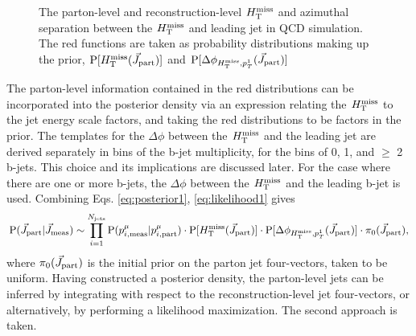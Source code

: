\begin{figure}[h]
\centering
{}
\caption{The parton-level and reconstruction-level $H_{\text{T}}^{\rm miss}$ and azimuthal separation between the $H_{\text{T}}^{\rm miss}$ and leading jet in QCD simulation. The red functions are taken as probability distributions making up the prior, $\text{P}[H_{\text{T}}^{\rm miss}(\vec{J}_{\rm part})]$ and $\text{P}[\Delta\phi_{H_{\text{T}}^{\rm miss},p_{T}^1}(\vec{J}_{\rm part})]$}
\label{fig:Mht}
\end{figure}

The parton-level information contained in the red distributions can be incorporated into the posterior density via an expression relating the $H_{\text{T}}^{\rm miss}$ to the jet energy scale factors, and taking the red distributions to be factors in the prior. The templates for the $\Delta\phi$ between the $H_{\text{T}}^{\rm miss}$ and the leading jet are derived separately in bins of the b-jet multiplicity, for the bins of 0, 1, and $\geq$ 2 b-jets.  This choice and its implications are discussed later. For the case where there are one or more b-jets, the $\Delta\phi$ between the $H_{\text{T}}^{\rm miss}$ and the leading b-jet is used. Combining Eqs. \ref{eq:posterior1}, \ref{eq:likelihood1} gives
\begin{equation}
{\rm P}(\vec{J}_{\rm part}|\vec{J}_{\rm meas}) \sim
\prod_{i=1}^{N_{\rm jets}}{\rm P}(p^{\mu}_{i,\rm meas}|p^{\mu}_{i,\rm part})\cdot \text{P}[H_{\text{T}}^{\rm miss}(\vec{J}_{\rm part})]\cdot \text{P}[\Delta\phi_{H_{\text{T}}^{\rm miss},p_{T}^1}(\vec{J}_{\rm part})]\cdot \pi_0(\vec{J}_{\rm part}),
\end{equation}
where $\pi_0(\vec{J}_{\rm part})$ is the initial prior on the parton jet four-vectors, taken to be uniform. Having constructed a posterior density, the parton-level jets can be inferred by integrating with respect to the reconstruction-level jet four-vectors, or alternatively, by performing a likelihood maximization. The second approach is taken.


